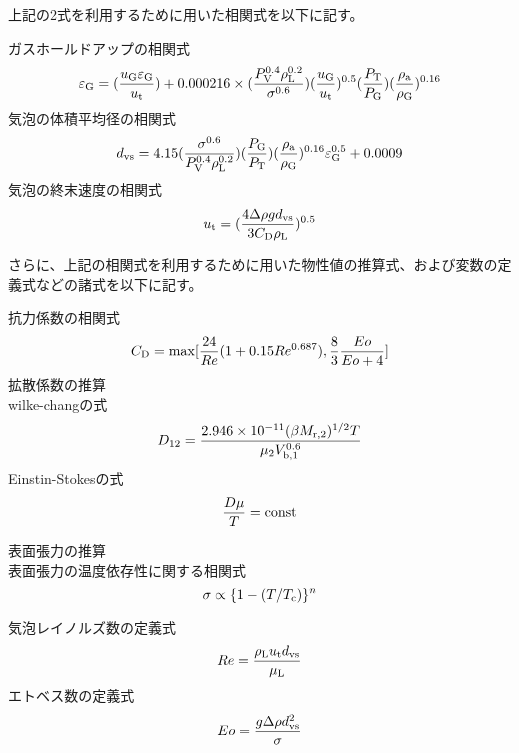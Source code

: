 \documentclass[a4j]{jsarticle}
\begin{document}
上記の2式を利用するために用いた相関式を以下に記す。

ガスホールドアップの相関式
\begin{equation}
    \varepsilon_{{\rm G}} = (\frac{u_{{\rm G}}\varepsilon_{{\rm G}}}{u_{{\rm t}}}) + 0.000216 \times(\frac{P_{{\rm V}}^{0.4} \rho_{{\rm L}}^{0.2} }{ \sigma^{0.6}})(\frac{u_{{\rm G}}}{u_{{\rm t}}})^{0.5}(\frac{P_{{\rm T}}}{P_{{\rm G}}})(\frac{\rho_{{\rm a}}}{\rho_{{\rm G}}})^{0.16}
\end{equation}
気泡の体積平均径の相関式
\begin{equation}
    d_{{\rm vs}} = 4.15 (\frac{\sigma^{0.6}}{P_{{\rm V}}^{0.4} \rho_{{\rm L}}^{0.2}})(\frac{P_{{\rm G}}}{P_{{\rm T}}})(\frac{\rho_{{\rm a}}}{\rho_{{\rm G}}})^{0.16} \varepsilon_{{\rm G}}^{0.5} + 0.0009
\end{equation}
気泡の終末速度の相関式
\begin{equation}
    u_{{\rm t}} = (\frac{4\Delta \rho g d_{{\rm vs}}}{3C_{{\rm D}}\rho_{{\rm L}}})^{0.5}
\end{equation}

さらに、上記の相関式を利用するために用いた物性値の推算式、および変数の定義式などの諸式を以下に記す。

抗力係数の相関式
\begin{equation}
    C_{{\rm D}} = {\rm max}[\frac{24}{Re}(1+0.15Re^{0.687}), \frac{8}{3}\frac{Eo}{Eo+4}]
\end{equation}
拡散係数の推算\\
wilke-changの式
\begin{equation}
    D_{12} = \frac{2.946\times 10^{-11}(\beta M_{{\rm r,2}})^{1/2} T} {\mu_2 V_{{\rm b,1}}^{0.6}}
\end{equation}
Einstin-Stokesの式
\begin{equation}
    \frac{D \mu}{T} = {\rm const}
\end{equation}

表面張力の推算\\
表面張力の温度依存性に関する相関式
\begin{equation}
    \sigma \propto \{1-(T/T_{{\rm c}}) \}^n    
\end{equation}

気泡レイノルズ数の定義式
\begin{equation}
    Re = \frac{\rho_{{\rm L}}u_{{\rm t}}d_{{\rm vs}}}{\mu_{{\rm L}}}
\end{equation}
エトベス数の定義式
\begin{equation}
    Eo = \frac{g \Delta \rho d_{{\rm vs}}^2}{\sigma}
\end{equation}
\end{document}
